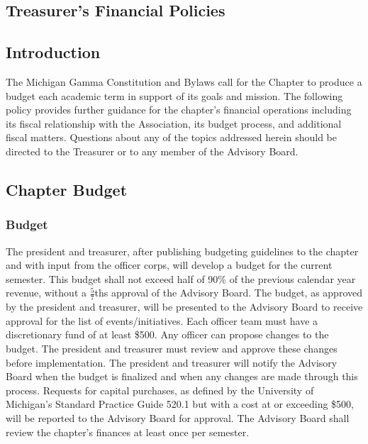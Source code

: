 \documentclass[bylaws,final,10pt,withoutoptional,withoutpreface,officerdoc]{../bylaws}
\begin{document}

\newcommand{\removed}[1]{\cbstart\removedfragile{#1}\cbend{}}
\newcommand{\removedfragile}[1]{{\color{red}{#1}}{}}
\newcommand{\added}[1]{\cbstart\addedfragile{#1}\cbend{}}
\newcommand{\addedfragile}[1]{{\color{green!50!black}{#1}}{}}
\newcommand{\changed}[2]{\added{#1}\removed{#2}}



\frontmatter
\maketitle 
%
%
\tableofcontents\newpage
\mainmatter
\begin{optionalpart}
\part{Treasurer's Financial Policies}
\end{optionalpart}


\chapter{Introduction}\label{sec:intro}

The Michigan Gamma Constitution and Bylaws call for the Chapter to produce a budget each academic term in support of its goals and mission. The following policy provides further guidance for the chapter's financial operations including its fiscal relationship with the Association, its budget process, and  additional fiscal matters. Questions about any of the topics addressed herein should be directed to the Treasurer or to any member of the Advisory Board.

\chapter{Chapter Budget}\label{sec:budget}

\section{Budget}
The president and treasurer, after publishing budgeting guidelines to the chapter and with input from the officer corps, will develop a budget for the current semester. This budget shall not exceed half of 90\% of the previous calendar year revenue, without a $\frac{5}{7}$ths approval of the Advisory Board. The budget, as approved by the president and treasurer, will be presented to the Advisory Board to receive approval for the list of events/initiatives. Each officer team must have a discretionary fund of at least \$500. Any officer can propose changes to the budget. The president and treasurer must review and approve these changes before implementation. The president and treasurer will notify the Advisory Board when the budget is finalized and when any changes are made through this process. Requests for capital purchases, as defined by the University of Michigan's Standard Practice Guide 520.1 but with a cost at or exceeding \$500, will be reported to the Advisory Board for approval. The Advisory Board shall review the chapter’s finances at least once per semester.
\hfil \break
\end{document}
